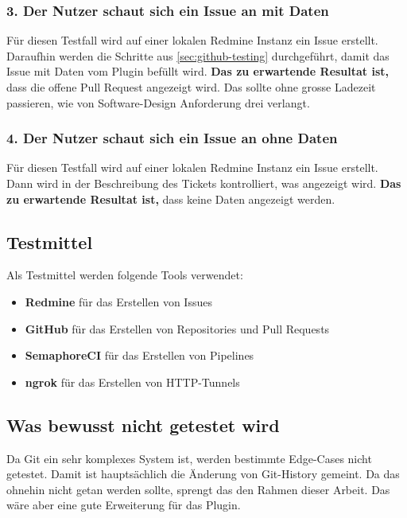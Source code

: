 \subsubsection{3. Der Nutzer schaut sich ein Issue an mit Daten}
Für diesen Testfall wird auf einer lokalen Redmine Instanz ein Issue erstellt. Daraufhin werden die Schritte aus
\ref{sec:github-testing} durchgeführt, damit das Issue mit Daten vom Plugin befüllt wird. \newline
\textbf{Das zu erwartende Resultat ist,} dass die offene Pull Request angezeigt wird. Das sollte ohne grosse Ladezeit passieren, wie von 
Software-Design Anforderung drei verlangt.

\subsubsection{4. Der Nutzer schaut sich ein Issue an ohne Daten}
Für diesen Testfall wird auf einer lokalen Redmine Instanz ein Issue erstellt. Dann wird in der Beschreibung des Tickets
kontrolliert, was angezeigt wird. \newline
\textbf{Das zu erwartende Resultat ist,} dass keine Daten angezeigt werden.

\subsection{Testmittel}
Als Testmittel werden folgende Tools verwendet:
\begin{itemize}
  \item \textbf{Redmine} für das Erstellen von Issues
  \item \textbf{GitHub} für das Erstellen von Repositories und Pull Requests
  \item \textbf{SemaphoreCI} für das Erstellen von Pipelines
  \item \textbf{ngrok} für das Erstellen von HTTP-Tunnels
\end{itemize}

\subsection{Was bewusst nicht getestet wird}
Da Git ein sehr komplexes System ist, werden bestimmte Edge-Cases nicht getestet. Damit ist hauptsächlich
die Änderung von Git-History gemeint. Da das ohnehin nicht getan werden sollte, sprengt das den Rahmen
dieser Arbeit. Das wäre aber eine gute Erweiterung für das Plugin.
